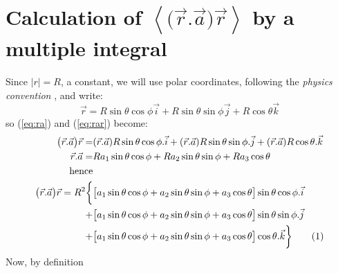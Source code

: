 \documentclass[]{article}
\newcommand\numberthis{\addtocounter{equation}{1}\tag{\theequation}}
\begin{document}
\section{Calculation of $\left\langle \big(\vec{r}.\vec{a}\big)\vec{r} \right\rangle$ by a multiple integral}\label{sect:long}
Since $|r|=R$, a constant, we will use polar coordinates, following the \emph{physics convention} \cite{schaum-basic} \cite{wiki-polar}, and write:
$$\vec{r}=R\sin\theta\cos\phi\vec{i}+R\sin\theta\sin\phi\vec{j}+R\cos\theta\vec{k}$$
so (\ref{eq:ra}) and (\ref{eq:rar}) become:
\begin{align*}
\big(\vec{r}.\vec{a}\big)\vec{r} =& (\vec{r}.\vec{a}) R \sin\theta\cos\phi .\vec{i} + (\vec{r}.\vec{a})R\sin\theta\sin\phi . \vec{j} + (\vec{r}.\vec{a}) R\cos\theta. \vec{k}\\
\vec{r}.\vec{a} =& Ra_1\sin\theta\cos\phi + Ra_2\sin\theta\sin\phi + Ra_3 \cos\theta\\
\text{hence}&\\
\big(\vec{r}.\vec{a}\big)\vec{r} = R^2 \bigg\{& \big[a_1\sin\theta\cos\phi + a_2\sin\theta\sin\phi + a_3 \cos\theta\big] \sin\theta\cos\phi.\vec{i}\\ +& \big[a_1\sin\theta\cos\phi + a_2\sin\theta\sin\phi + a_3 \cos\theta\big]\sin\theta\sin\phi. \vec{j}\\
 +& \big[a_1\sin\theta\cos\phi + a_2\sin\theta\sin\phi + a_3 \cos\theta\big] \cos\theta. \vec{k}\bigg\}\numberthis \label{eq:rar_expanded}
\end{align*}
Now, by definition
\end{document}
